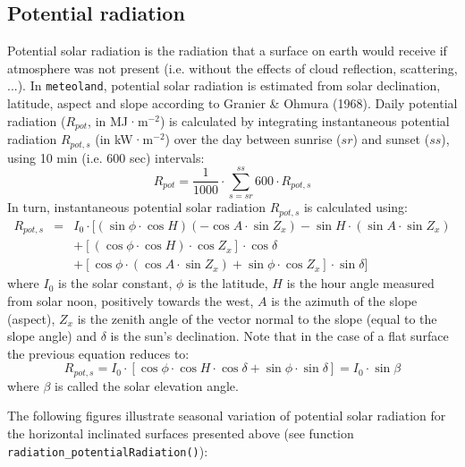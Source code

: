 \documentclass[11pt,a4paper]{article}
\begin{document}
\subsection{Potential radiation}
Potential solar radiation is the radiation that a surface on earth would receive if atmosphere was not present (i.e. without the effects of cloud reflection, scattering, ...). In \texttt{meteoland}, potential solar radiation is estimated from solar declination, latitude, aspect and slope according to Granier \& Ohmura (1968). Daily potential radiation ($R_{pot}$, in MJ·m$^{-2}$) is calculated by integrating instantaneous potential radiation $R_{pot,s}$ (in kW·m$^{-2}$) over the day between sunrise ($sr$) and sunset ($ss$), using 10 min (i.e. 600 sec) intervals:
\begin{equation}
R_{pot} = \frac{1}{1000}\cdot \sum_{s = sr}^{ss}{600 \cdot R_{pot,s}}
\end{equation}
In turn, instantaneous potential solar radiation $R_{pot,s}$ is calculated using:
\begin{eqnarray}
R_{pot,s} &=& I_0 \cdot [(\sin{\phi}\cdot \cos{H})(-\cos{A}\cdot \sin{Z_x})  -\sin{H}\cdot (\sin{A}\cdot \sin{Z_x}) \nonumber \\
 & & + [(\cos{\phi}\cdot \cos{H})\cdot \cos{Z_x}]\cdot \cos{\delta} \nonumber \\
 & & + [\cos{\phi}\cdot (\cos{A}\cdot \sin{Z_x})+ \sin{\phi}\cdot \cos{Z_x}]\cdot \sin{\delta}]
\end{eqnarray}
where $I_0$ is the solar constant, $\phi$ is the latitude, $H$ is the hour angle measured from solar noon, positively towards the west, $A$ is the azimuth of the slope (aspect), $Z_x$ is the zenith angle of the vector normal to the slope (equal to the slope angle) and $\delta$ is the sun's declination. Note that in the case of a flat surface the previous equation reduces to:
\begin{equation}
R_{pot,s} = I_0 \cdot [\cos{\phi}\cdot \cos{H}\cdot \cos{\delta} + \sin{\phi}\cdot \sin{\delta}]= I_0 \cdot \sin{\beta}
\end{equation}
where $\beta$ is called the solar elevation angle.

The following figures illustrate seasonal variation of potential solar radiation for the horizontal inclinated surfaces presented above (see function \texttt{radiation\_potentialRadiation()}):
\end{document}
